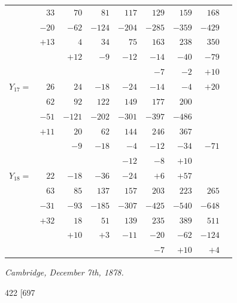 \documentclass[11pt]{article}
\begin{document}
\begin{center}
\begin{tabular}{l|rrrrrrrr}
          & $33$    & $70$    & $81$    & $117$   & $129$   & $159$     & $168$     &      \\
          & $-20$   & $-62$   & $-124$  & $-204$  & $-285$  & $-359$    & $-429$    &      \\
          & $+13$   & $4$     & $34$    & $75$    & $163$   & $238$     & $350$     &      \\
          &         & $+12$   & $-9$    & $-12$   & $-14$   & $-40$     & $-79$     &      \\
          &         &         &         &         & $-7$    & $-2$      & $+10$     &      \\
$Y_{17}=$ & $26$    & $24$    & $-18$   & $-24$   & $-14$   & $-4$      & $+20$     &      \\\hline
          & $62$    & $92$    & $122$   & $149$   & $177$   & $200$     &           &      \\
          & $-51$   & $-121$  & $-202$  & $-301$  & $-397$  & $-486$    &           &      \\
          & $+11$   & $20$    & $62$    & $144$   & $246$   & $367$     &           &      \\
          &         & $-9$    & $-18$   & $-4$    & $-12$   & $-34$     & $-71$     &      \\
          &         &         &         & $-12$   & $-8$    & $+10$     &           &      \\
$Y_{18}=$ & $22$    & $-18$   & $-36$   & $-24$   & $+6$    & $+57$     &           &      \\\hline
          & $63$    & $85$    & $137$   & $157$   & $203$   & $223$     & $265$     &      \\
          & $-31$   & $-93$   & $-185$  & $-307$  & $-425$  & $-540$    & $-648$    &      \\
          & $+32$   & $18$    & $51$    & $139$   & $235$   & $389$     & $511$     &      \\
          &         & $+10$   & $+3$    & $-11$   & $-20$   & $-62$     & $-124$    &      \\
          &         &         &         &         & $-7$    & $+10$     & $+4$      &      \\
\end{tabular}
\end{center}

\medskip
\noindent\textit{Cambridge, December 7th, 1878.}

\clearpage
\begin{center}\small 422 \hfill [697\end{center}
\end{document}
